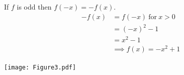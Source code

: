 \documentclass[nooutcomes]{ximera}
\begin{document}
\begin{problem}
\begin{enumerate}
	\begin{freeResponse}
	   If $f$ is odd then $f(-x)=-f(x)$. 
			\begin{align*}
			-f(x)&=f(-x)\ \text{for}\ x>0\\
			&=(-x)^2-1\\
			&=x^2-1\\
			& \implies f(x)=-x^2+1	
			\end{align*}
	
	\begin{image}		
	\texttt{[image: Figure3.pdf]}
	\end{image}
		

	\end{freeResponse}


	\end{enumerate}
	
	
	
	
\end{problem}
\end{document}
